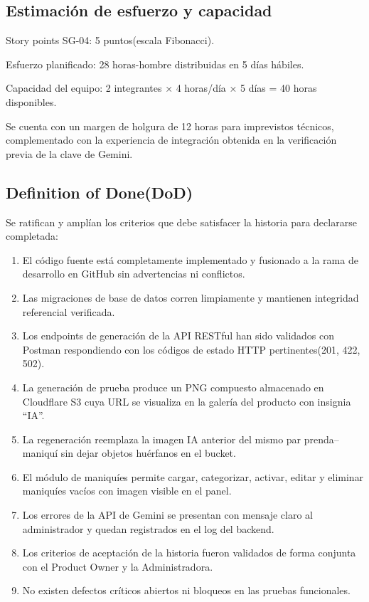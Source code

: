 \documentclass[12pt,a4paper]{article}
\begin{document}
\subsection*{Estimación de esfuerzo y capacidad}

Story points SG-04: 5 puntos(escala Fibonacci).

Esfuerzo planificado: 28 horas-hombre distribuidas en 5 días hábiles.

Capacidad del equipo: 2 integrantes × 4 horas/día × 5 días = 40 horas disponibles.

Se cuenta con un margen de holgura de 12 horas para imprevistos técnicos, complementado con la experiencia de integración obtenida en la verificación previa de la clave de Gemini.

\subsection*{Definition of Done(DoD)}

Se ratifican y amplían los criterios que debe satisfacer la historia para declararse completada:

\begin{enumerate}
    \item El código fuente está completamente implementado y fusionado a la rama de desarrollo en GitHub sin advertencias ni conflictos.
    \item Las migraciones de base de datos corren limpiamente y mantienen integridad referencial verificada.
    \item Los endpoints de generación de la API RESTful han sido validados con Postman respondiendo con los códigos de estado HTTP pertinentes(201, 422, 502).
    \item La generación de prueba produce un PNG compuesto almacenado en Cloudflare S3 cuya URL se visualiza en la galería del producto con insignia ``IA''.
    \item La regeneración reemplaza la imagen IA anterior del mismo par prenda--maniquí sin dejar objetos huérfanos en el bucket.
    \item El módulo de maniquíes permite cargar, categorizar, activar, editar y eliminar maniquíes vacíos con imagen visible en el panel.
    \item Los errores de la API de Gemini se presentan con mensaje claro al administrador y quedan registrados en el log del backend.
    \item Los criterios de aceptación de la historia fueron validados de forma conjunta con el Product Owner y la Administradora.
    \item No existen defectos críticos abiertos ni bloqueos en las pruebas funcionales.
\end{enumerate}
\end{document}
